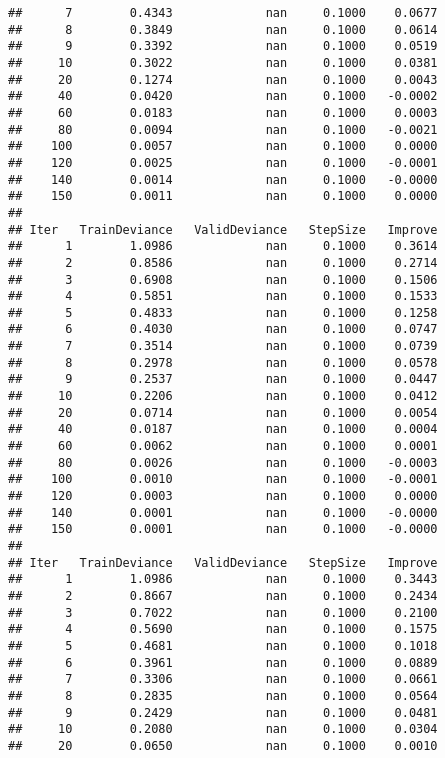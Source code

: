 \documentclass[
]{article}
\begin{document}
\begin{verbatim}
##      7        0.4343             nan     0.1000    0.0677
##      8        0.3849             nan     0.1000    0.0614
##      9        0.3392             nan     0.1000    0.0519
##     10        0.3022             nan     0.1000    0.0381
##     20        0.1274             nan     0.1000    0.0043
##     40        0.0420             nan     0.1000   -0.0002
##     60        0.0183             nan     0.1000    0.0003
##     80        0.0094             nan     0.1000   -0.0021
##    100        0.0057             nan     0.1000    0.0000
##    120        0.0025             nan     0.1000   -0.0001
##    140        0.0014             nan     0.1000   -0.0000
##    150        0.0011             nan     0.1000    0.0000
## 
## Iter   TrainDeviance   ValidDeviance   StepSize   Improve
##      1        1.0986             nan     0.1000    0.3614
##      2        0.8586             nan     0.1000    0.2714
##      3        0.6908             nan     0.1000    0.1506
##      4        0.5851             nan     0.1000    0.1533
##      5        0.4833             nan     0.1000    0.1258
##      6        0.4030             nan     0.1000    0.0747
##      7        0.3514             nan     0.1000    0.0739
##      8        0.2978             nan     0.1000    0.0578
##      9        0.2537             nan     0.1000    0.0447
##     10        0.2206             nan     0.1000    0.0412
##     20        0.0714             nan     0.1000    0.0054
##     40        0.0187             nan     0.1000    0.0004
##     60        0.0062             nan     0.1000    0.0001
##     80        0.0026             nan     0.1000   -0.0003
##    100        0.0010             nan     0.1000   -0.0001
##    120        0.0003             nan     0.1000    0.0000
##    140        0.0001             nan     0.1000   -0.0000
##    150        0.0001             nan     0.1000   -0.0000
## 
## Iter   TrainDeviance   ValidDeviance   StepSize   Improve
##      1        1.0986             nan     0.1000    0.3443
##      2        0.8667             nan     0.1000    0.2434
##      3        0.7022             nan     0.1000    0.2100
##      4        0.5690             nan     0.1000    0.1575
##      5        0.4681             nan     0.1000    0.1018
##      6        0.3961             nan     0.1000    0.0889
##      7        0.3306             nan     0.1000    0.0661
##      8        0.2835             nan     0.1000    0.0564
##      9        0.2429             nan     0.1000    0.0481
##     10        0.2080             nan     0.1000    0.0304
##     20        0.0650             nan     0.1000    0.0010

\end{verbatim}
\end{document}
